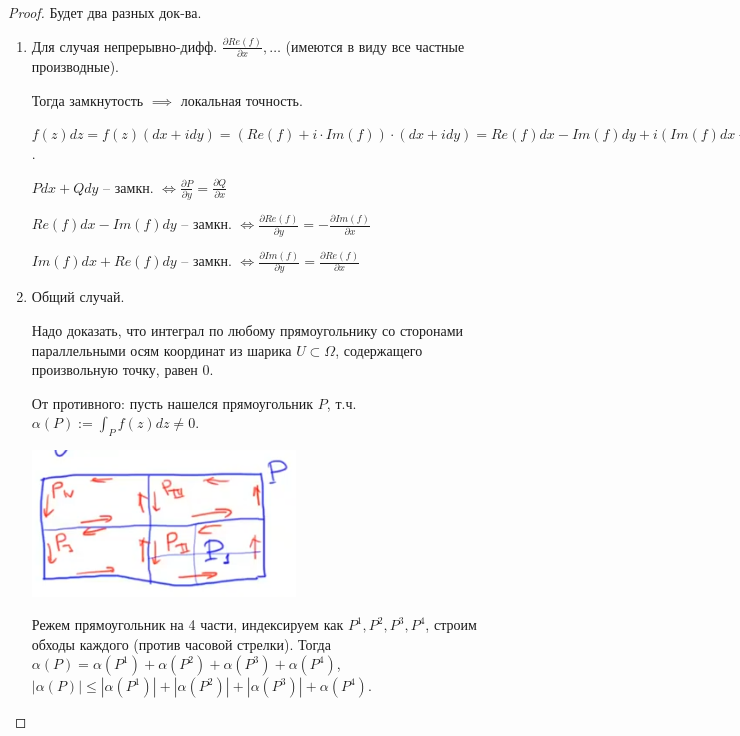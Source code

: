 \begin{proof}
    Будет два разных док-ва.

    \begin{enumerate}
        \item {
            Для случая непрерывно-дифф. $\frac{\partial Re(f)}{\partial x}, \dots$ (имеются в виду все частные производные).

            Тогда замкнутость $\implies$ локальная точность.

            $f(z) dz = f(z) (dx + i dy) = (Re(f) + i \cdot Im(f)) \cdot (dx + i dy) = Re(f) dx - Im(f) dy + i (Im (f) dx + Re(f) dy)$.

            $P dx + Q dy$ -- замкн. $\Leftrightarrow \frac{\partial P}{\partial y} = \frac{\partial Q}{\partial x}$

            $Re(f) dx - Im(f) dy$ -- замкн. $\Leftrightarrow \frac{\partial Re(f)}{\partial y} = - \frac{\partial Im(f)}{\partial x}$

            $Im(f) dx + Re(f) dy$ -- замкн. $\Leftrightarrow \frac{\partial Im(f)}{\partial y} = \frac{\partial Re(f)}{\partial x}$
        }
        \item {
            Общий случай.

            Надо доказать, что интеграл по любому прямоугольнику со сторонами параллельными осям координат из шарика $U \subset \Omega$, содержащего произвольную точку, равен 0.

            От противного: пусть нашелся прямоугольник $P$, т.ч. $\alpha (P) := \int_P {f(z) dz } \not = 0$.

            \begin{center}
                \includegraphics[width=7cm]{assets/04-functions-of-complex-variables/Cauchy-theorem-rectangle-partition.png}
            \end{center}

            
            Режем прямоугольник на 4 части, индексируем как $P^{1}, P^{2}, P^{3}, P^{4}$, строим обходы каждого (против часовой стрелки). Тогда $\alpha(P) = \alpha(P^{1}) + \alpha(P^{2}) + \alpha(P^{3}) + \alpha(P^{4})$, $|\alpha(P)| \leq |\alpha(P^{1})| + |\alpha(P^{2})| + |\alpha(P^{3})| + \alpha(P^{4})$.

}
\end{enumerate}
\end{proof}
